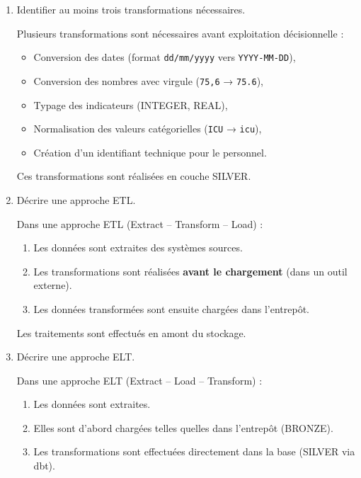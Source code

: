 \documentclass[11pt,a4paper]{article}
\begin{document}
\begin{enumerate}
  \item Identifier au moins trois transformations nécessaires.
    \begin{tcolorbox}[title=\textbf{Correction — Transformations nécessaires}, colback=gray!5, colframe=black]
    Plusieurs transformations sont nécessaires avant exploitation décisionnelle :

    \begin{itemize}
      \item Conversion des dates (format \texttt{dd/mm/yyyy} vers \texttt{YYYY-MM-DD}),
      \item Conversion des nombres avec virgule (\texttt{75,6} → \texttt{75.6}),
      \item Typage des indicateurs (INTEGER, REAL),
      \item Normalisation des valeurs catégorielles (\texttt{ICU} → \texttt{icu}),
      \item Création d’un identifiant technique pour le personnel.
    \end{itemize}

    Ces transformations sont réalisées en couche SILVER.
    \end{tcolorbox}
  \item Décrire une approche ETL.
    \begin{tcolorbox}[title=\textbf{Correction — Approche ETL}, colback=gray!5, colframe=black]
    Dans une approche ETL (Extract – Transform – Load) :

    \begin{enumerate}
      \item Les données sont extraites des systèmes sources.
      \item Les transformations sont réalisées \textbf{avant le chargement} (dans un outil externe).
      \item Les données transformées sont ensuite chargées dans l’entrepôt.
    \end{enumerate}

    Les traitements sont effectués en amont du stockage.
    \end{tcolorbox}
  \item Décrire une approche ELT.
    \begin{tcolorbox}[title=\textbf{Correction — Approche ELT}, colback=gray!5, colframe=black]
    Dans une approche ELT (Extract – Load – Transform) :

    \begin{enumerate}
      \item Les données sont extraites.
      \item Elles sont d’abord chargées telles quelles dans l’entrepôt (BRONZE).
      \item Les transformations sont effectuées directement dans la base (SILVER via dbt).
    \end{enumerate}


\end{tcolorbox}
\end{enumerate}
\end{document}
